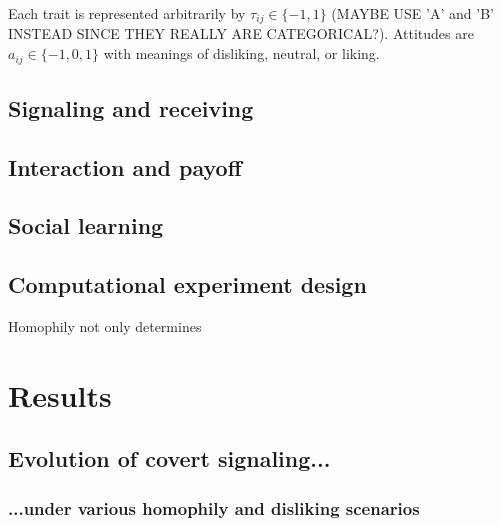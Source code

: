 \documentclass[11pt,letterpaper]{article}
\begin{document}
Each trait is represented arbitrarily by $\tau_{ij} \in \{-1, 1\}$ 
(MAYBE USE 'A' and 'B' INSTEAD SINCE THEY REALLY ARE CATEGORICAL?). 
Attitudes are $a_{ij} \in \{-1, 0, 1\}$ with meanings of 
disliking, neutral, or liking. 

\subsection{Signaling and receiving}

\subsection{Interaction and payoff}

\subsection{Social learning}

\subsection{Computational experiment design}



Homophily not only determines 





\section{Results}

\subsection{Evolution of covert signaling...}

\subsubsection{...under various homophily and disliking scenarios}
\end{document}
